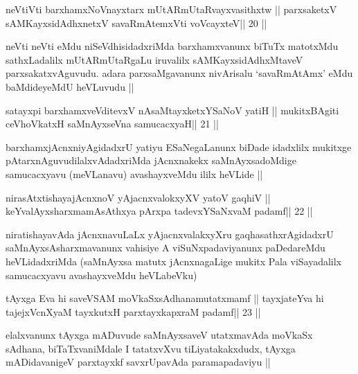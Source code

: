\begin{shl}
neVtiVti barxhamxNoV\s nayxtarx mUtARmUtaRvayxvasithxtw ||
parxsaketxV sAMKayxsidAdhxnetxV savaRmAtemxVti voVcayxteV\hfill || 20 ||
\end{shl}

\begin{artha}
neVti neVti eMdu niSeVdhisidadxriMda barxhamxvanunx biTuTx matotxMdu
sathxLadalilx mUtARmUtaRgaLu iruvalilx sAMKayxsidAdhxMtaveV
parxsakatxvAguvudu. adara parxsaMgavanunx nivArisalu `savaRmAtAmx'
eMdu baMdideyeMdU heVLuvudu ||
\end{artha}


\begin{shl}
satayxpi barxhamxveVditevxV nAsaMtayxketxYSaNoV yatiH ||
mukitxBAgiti ceVhoVkatxH saMnAyxseVna samucacxyaH\hfill || 21 ||
\end{shl}

\begin{artha}
barxhamxjAcnxniyAgidadxrU yatiyu ESaNegaLanunx biDade idadxlilx
mukitxge pAtarxnAguvudilalxvAdadxriMda jAcnxnakekx saMnAyxsadoMdige
samucacxyavu (meVLanavu) avashayxveMdu ililx heVLide ||
\end{artha}

\begin{shl}
nirasAtxtishayajAcnxnoV yAjacnxvalokxyXV yatoV gaqhiV ||
keYvalAyxsharxmamAsAthxya pArxpa tadevxYSaNxvaM padamf\hfill || 22 ||
\end{shl}

\begin{artha}
niratishayavAda jAcnxnavuLaLx yAjacnxvalakxyXru gaqhasathxrAgidadxrU
saMnAyxsAsharxmavanunx vahisiye A viSuNxpadaviyanunx paDedareMdu
heVLidadxriMda (saMnAyxsa matutx jAcnxnagaLige mukitx Pala
viSayadalilx samucacxyavu avashayxveMdu heVLabeVku)
\end{artha}


\begin{shl}
tAyxga Eva hi saveVSAM moVkaSxsAdhanamutatxmamf ||
tayxjateYva hi tajejxVcnXyaM tayxkutxH parxtayxkapxraM padamf\hfill || 23 ||
\end{shl}

\begin{artha}
elalxvanunx tAyxga mADuvude saMnAyxsaveV utatxmavAda
moVkaSx sAdhana, biTaTxvaniMdale I tatatxvXvu tiLiyatakakxdudx, tAyxga
mADidavanigeV parxtayxkf savxrUpavAda paramapadaviyu ||
\end{artha}

